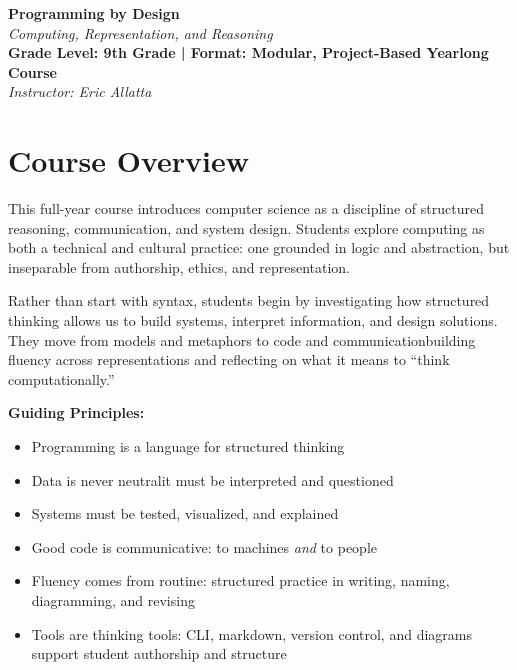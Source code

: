 \documentclass[11pt]{article}
\begin{document}
\begin{center}
  {\LARGE \textbf{Programming by Design}} \\[0.25em]
  {\large \textit{Computing, Representation, and Reasoning}} \\[0.5em]
  \textbf{Grade Level: 9th Grade \quad | \quad Format: Modular, Project-Based Yearlong Course} \\[0.5em]
  \textit{Instructor: Eric Allatta}
\end{center}

\section*{Course Overview}
This full-year course introduces computer science as a discipline of structured reasoning, communication, and system design. Students explore computing as both a technical and cultural practice: one grounded in logic and abstraction, but inseparable from authorship, ethics, and representation.

Rather than start with syntax, students begin by investigating how structured thinking allows us to build systems, interpret information, and design solutions. They move from models and metaphors to code and communication\textemdash building fluency across representations and reflecting on what it means to \textquotedblleft think computationally.\textquotedblright

\textbf{Guiding Principles:}
\begin{itemize}[leftmargin=*]
  \item Programming is a language for structured thinking
  \item Data is never neutral\textemdash it must be interpreted and questioned
  \item Systems must be tested, visualized, and explained
  \item Good code is communicative: to machines \textit{and} to people
  \item Fluency comes from routine: structured practice in writing, naming, diagramming, and revising
  \item Tools are thinking tools: CLI, markdown, version control, and diagrams support student authorship and structure
\end{itemize}
\end{document}
